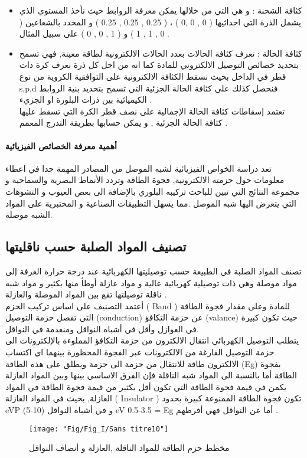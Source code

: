 \begin{enumerate}
\begin{itemize}
\begin{enumerate}
		\end{enumerate}
		\item
		كثافة الشحنة : و هي التي من خلالها يمكن معرفة الروابط حيث نأخذ المستوي الذي يشمل الذرة التي احداثيها ( 0 , 0 ,0 ) ، ( 0.25 , 0.25 , 0.25 ) و المحدد بالشعاعين ( 0 , 1 , 1 ) و ( 1 , 0 , 0 )  على سبيل المثال .
		\item
		كثافة الحالة : تعرف كثافة الحالات بعدد الحالات الالكترونية لطاقة معينة, فهي تسمح بتحديد خصائص التوصيل الالكتروني للمادة كما انه من اجل كل ذرة نعرف كرة ذات قطر في الداخل بحيث نسقط الكثافة الالكترونية على التوافقية الكروية من نوع s,p,d فنحصل كذلك على كثافة الحالة الجزئية التي تسمح بتحديد بنية الروابط الكيميائية بين ذرات البلورة او الجزيء .\\
		تعتمد إسقاطات كثافة الحالة الإجمالية على نصف قطر الكرة التي تسقط عليها كثافة الحالة الجزئية , و يمكن حسابها بطريقة التدرج المعمم .
		
	\end{itemize}
	
\end{enumerate}


\paragraph{أهمية معرفة الخصائص الفيزيائية }

تعد دراسة الخواص الفيزيائية لشبه الموصل من المصادر المهمة جدا في اعطاء معلومات حول حزمته الالكترونية, فجوة الطاقة وتردد الأنماط البصرية والسماحية و مجموعة النتائج التي تبين للباحث  تركيبه البلوري بالإضافة الى بعض العيوب و التشوهات التي يتعرض اليها شبه الموصل .مما يسهل التطبيقات الصناعية و المختبرية على المواد الشبه موصلة.

\subsection{تصنيف المواد الصلبة حسب ناقليتها }
تصنف المواد الصلبة في الطبيعة حسب توصيليتها الكهربائية عند
درجة حرارة الغرفة إلى مواد موصلة وهي ذات توصيلية كهربائية عالية و مواد عازلة أوطأ منها بكثير و مواد شبه ناقلة توصيلتها تقع بين المواد الموصلة والعازلة .\\
أعتمد التصنيف على اساس تركيب الحزم ( Band ) للمادة وعلى مقدار فجوة الطاقة التي تفصل حزمة التوصيل (conduction) عن حزمة التكافؤ (valance) حيث تكون كبيرة في العوازل وأقل في أشباه النواقل ومنعدمة في النواقل.\\
يتطلب التوصيل الكهربائي انتقال الالكترون من حزمة التكافؤ المملوءة بالإلكترونات الى حزمة التوصيل الفارغة من الالكترونات 
عبر الفجوة المحظورة بينهما اي اكتساب الالكترون طاقة للانتقال من حزمة الى حزمة ويطلق على هذه الطاقة (Eg) بفجوة الطاقة أما بالنسبة الى المواد شبه الناقلة فإن الفرق الاساسي بينها وبين المواد العازلة يكمن في قيمة فجوة الطاقة التي تكون أقل بكثير من قيمة فجوة الطاقة في المواد العازلة, بحيث  في المواد العازلة (  Insulator ) تكون فجوة الطاقة الممنوعة كبيرة بحدود eVP (5-10) و في أشباه النواقل eV 0.5-3.5  = E{g} أما عن النواقل فهي أفرطهم .
\begin{figure}[h]
	\centering
	\texttt{[image: "Fig/Fig\_I/Sans titre10"]}
	\caption{مخطط حزم الطاقة للمواد الناقلة ,العازلة و أنصاف النواقل }
	\label{fig:sans-titre10}
\end{figure}
\FloatBarrier

